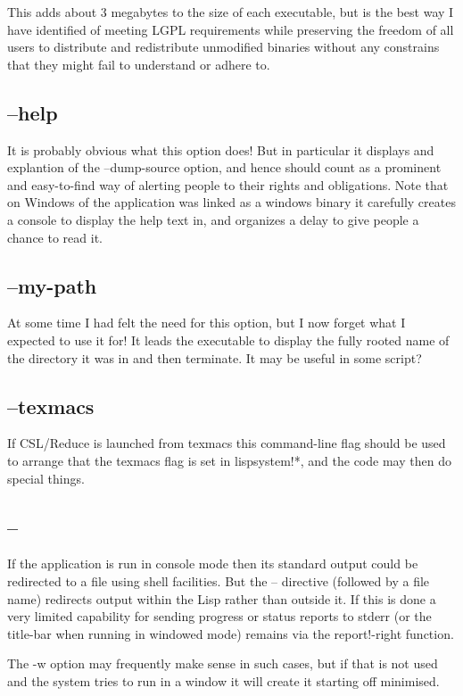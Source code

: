 \documentclass[a4paper,11pt]{article}
\begin{document}
This adds about 3 megabytes to the size of each executable, but is the best
way I have identified of meeting LGPL requirements while preserving the freedom
of all users to distribute and redistribute unmodified binaries without any
constrains that they might fail to understand or adhere to.
\subsection{\ttfamily --help}
It is probably obvious what this option does! But in particular it displays
and explantion of the {\ttfamily --dump-source} option, and hence should
count as a prominent and easy-to-find way of alerting people to their rights
and obligations. Note that on Windows of the application was linked as a
windows binary it carefully creates a console to display the help text
in, and organizes a delay to give people a chance to read it.
\subsection{\ttfamily --my-path}
At some time I had felt the need for this option, but I now forget what I
expected to use it for! It leads the executable to display the fully
rooted name of the directory it was in and then terminate. It may be useful
in some script?
\subsection{\ttfamily --texmacs}
If CSL/Reduce is launched from texmacs this command-line flag should be
used to arrange that the {\ttfamily texmacs} flag is set in
{\ttfamily lispsystem!*}, and the code may then do special things.
\subsection{\ttfamily --}
If the application is run in console mode then its standard output could
be redirected to a file using shell facilities. But the {\ttfamily --}
directive (followed by a file name) redirects output within the Lisp rather
than outside it. If this is done a very limited capability for sending
progress or status reports to stderr (or the title-bar when running in windowed
mode) remains via the {\ttfamily report!-right} function.

The {\ttfamily -w} option may frequently make sense in such cases, but if that
is not used and the system tries to run in a window it will create it
starting off minimised.
\end{document}
